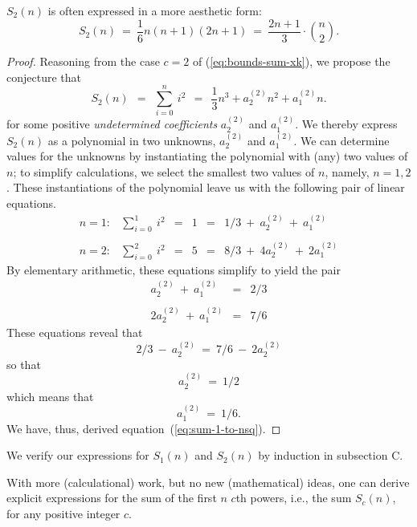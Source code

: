 \noindent
$S_2(n)$ is often expressed in a more aesthetic form:
\[ S_2(n) \ = \
\frac{1}{6} n (n+1)(2n+1) \ = \
\frac{2n+1}{3} \cdot {n \choose 2}.
\]

\begin{proof}
Reasoning from the case $c=2$ of (\ref{eq:bounds-sum-xk}), we
propose the conjecture that
\begin{equation}
\label{eq:symbolic-cubic}
S_2(n) \ \ = \ \
\sum_{i=0}^n \ i^2 \ \ = \ \ \frac{1}{3} n^3 + a^{(2)}_2 n^2 + a^{(2)}_1 n.
\end{equation}
for some positive {\it undetermined coefficients} $a^{(2)}_2$ and
$a^{(2)}_1$.  We thereby express $S_2(n)$ as a polynomial in two
unknowns, $a^{(2)}_2$ and $a^{(2)}_1$.  We can determine values for
the unknowns by instantiating the polynomial with (any) two values of
$n$; to simplify calculations, we select the smallest two values of
$n$, namely, $n = 1,2$.  These instantiations of the polynomial leave
us with the following pair of linear equations.
\[
\begin{array}{cccccl}
n=1: & \sum_{i=0}^1 \ i^2
   & = & 1 & = &
1/3 \ + \ a^{(2)}_2 \ + \ a^{(2)}_1 \\
 & & & & & \\
n=2: & \sum_{i=0}^2 \ i^2
   & = & 5 & = &
8/3 \ + \ 4 a^{(2)}_2 \ + \ 2 a^{(2)}_1
\end{array}
\]
By elementary arithmetic, these equations simplify to yield the pair
\[
\begin{array}{ccc}
a^{(2)}_2 \ + \ a^{(2)}_1   & = & 2/3 \\
 & & \\
2 a^{(2)}_2 \ + \ a^{(2)}_1 & = & 7/6
\end{array}
\]
These equations reveal that
\[ 2/3 \ - \ a^{(2)}_2 \ = \ 7/6 \ - \ 2 a^{(2)}_2 \]
so that 
\[ a^{(2)}_2 \ = \ 1/2 \]
which means that
\[ a^{(2)}_1 \ = \ 1/6. \]
We have, thus, derived equation~(\ref{eq:sum-1-to-nsq}).  
\end{proof}

\medskip

We verify our expressions for $S_1(n)$ and $S_2(n)$ by induction in
subsection C.

\medskip

With more (calculational) work, but no new (mathematical) ideas, one
can derive explicit expressions for the sum of the first $n$ $c$th
powers, i.e., the sum $S_c(n)$, for any positive integer $c$.


\medskip

